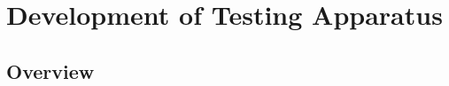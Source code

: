 

\renewcommand{\thechapter}{3}

\chapter{Development of Testing Apparatus}

\section{Overview}

\lipsum
